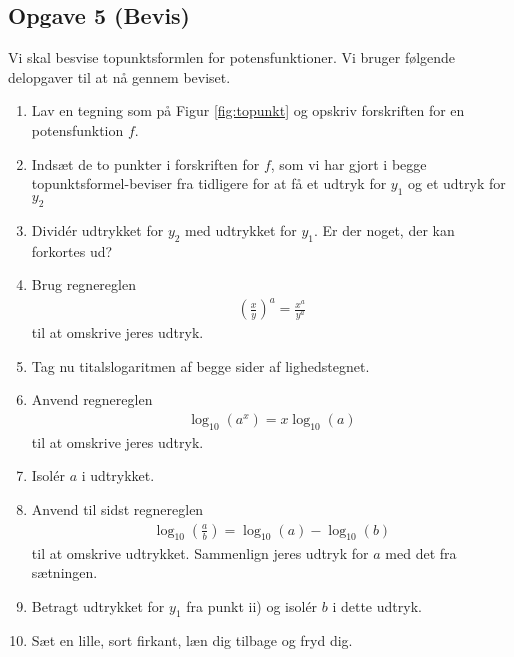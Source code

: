 \subsection*{Opgave 5 (Bevis)}
Vi skal besvise topunktsformlen for potensfunktioner. Vi bruger følgende delopgaver til at nå gennem beviset.
\begin{enumerate}[label=\roman*)]
	\item Lav en tegning som på Figur \ref{fig:topunkt} og opskriv forskriften for en potensfunktion $f$.
	\item Indsæt de to punkter i forskriften for $f$, som vi har gjort i begge topunktsformel-beviser fra 
	tidligere for at få et udtryk for $y_1$ og et udtryk for $y_2$
	\item Dividér udtrykket for $y_2$ med udtrykket for $y_1$. Er der noget, der kan forkortes ud?
	\item Brug regnereglen
	\begin{align*}
		\left(\frac{x}{y}\right)^a = \frac{x^a}{y^a}
	\end{align*}
	til at omskrive jeres udtryk.
	\item Tag nu titalslogaritmen af begge sider af lighedstegnet.
	\item Anvend regnereglen 
	\begin{align*}
		\log_{10}(a^x) = x\log_{10}(a)
	\end{align*}
	til at omskrive jeres udtryk.
	\item Isolér $a$ i udtrykket.
	\item Anvend til sidst regnereglen 
	\begin{align*}
		\log_{10}\left(\frac{a}{b}\right) = \log_{10}(a)-\log_{10}(b)
	\end{align*}
	til at omskrive udtrykket. Sammenlign jeres udtryk for $a$ med det fra sætningen. 
	\item Betragt udtrykket for $y_1$ fra punkt ii) og isolér $b$ i dette udtryk.
	\item Sæt en lille, sort firkant, læn dig tilbage og fryd dig.
\end{enumerate} 